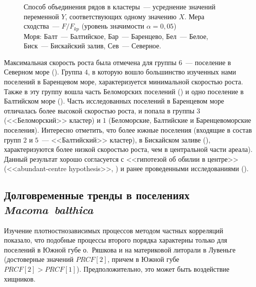 {\begin{figure}[ht]
{Способ объединения рядов в кластеры~--- усреднение значений переменной $Y$, соответствующих одному значению $X$.
Мера сходства~--- $F/F_{kp}$ (уровень значимости $\alpha = 0,05$)\\
Моря: Балт~--- Балтийское, Бар~--- Баренцево, Бел~--- Белое, Биск~--- Бискайский залив, Сев~--- Северное.}
		\label{ris:growth_cluster_literature}
	\end{figure}
Максимальная скорость роста была отмечена для группы $6$~--- поселение в Северном море (\cite{Vogel_1959}). 
Группа $4$, в которую вошло большинство изученных нами поселений в Баренцевом море, характеризуется минимальной скоростью роста.
Также в эту группу вошла часть Беломорских поселений (\cite{Semenova_1970}) и одно поселение в Балтийском море (\cite{Bergh_1974}).
Часть исследованных поселений в Баренцевом море отличалась более высокой скоростью роста, и попала в группы $3$ (<<Беломорский>> кластер) и $1$ (Беломорские, Балтийские и Баренцевоморские поселения).
Интересно отметить, что более южные поселения (входящие в состав групп $2$ и $5$~--- <<Балтийский>> кластер), в Бискайском заливе (\cite{Bachelet_1980}), характеризуются более низкой скоростью роста, чем в центральной части ареала).
Данный результат хорошо согласуется с <<гипотезой об обилии в центре>> (<<abundant-centre hypothesis>>, \cite{Sagarin_et_al_2006}) и ранее проведенными исследованиями (\cite{Beukema_Meehan_1985, Hummel_et_al_1998}).

\subsection*{Долговременные тренды в поселениях \textit{Macoma~balthica}}
Изучение плотностнозависимых процессов методом частных корреляций показало, что подобные процессы второго порядка характерны только для поселений в Южной губе о.~Ряшкова и на материковой литорали в Лувеньге (достоверные значений $PRCF[2]$, причем в Южной губе $PRCF[2] > PRCF[1]$).
Предположительно, это может быть воздействие хищников.

}
